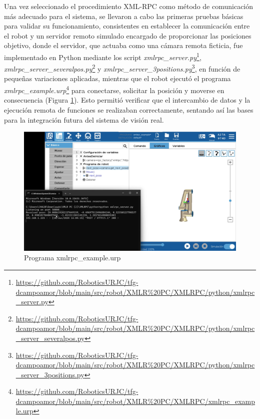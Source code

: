 Una vez seleccionado el procedimiento XML-RPC como método de comunicación más adecuado para el sistema, se llevaron a cabo las primeras pruebas básicas para validar su funcionamiento, consistentes en establecer la comunicación entre el robot y un servidor remoto simulado encargado de proporcionar las posiciones objetivo, donde el servidor, que actuaba como una cámara remota ficticia, fue implementado en Python mediante los script \textit{xmlrpc\_server.py}\footnote{\url{https://github.com/RoboticsURJC/tfg-dcampoamor/blob/main/src/robot/XMLR\%20PC/XMLRPC/python/xmlrpc_server.py}}, \textit{xmlrpc\_server\_severalpos.py}\footnote{\url{https://github.com/RoboticsURJC/tfg-dcampoamor/blob/main/src/robot/XMLR\%20PC/XMLRPC/python/xmlrpc_server_severalpos.py}} y \textit{xmlrpc\_server\_3positions.py}\footnote{\url{https://github.com/RoboticsURJC/tfg-dcampoamor/blob/main/src/robot/XMLR\%20PC/XMLRPC/python/xmlrpc_server_3positions.py}}, en función de pequeñas variaciones aplicadas, mientras que el robot ejecutó el programa \textit{xmlrpc\_example.urp}\footnote{\url{https://github.com/RoboticsURJC/tfg-dcampoamor/blob/main/src/robot/XMLR\%20PC/XMLRPC/xmlrpc_example.urp}} para conectarse, solicitar la posición y moverse en consecuencia (Figura \ref{fig:prueba_xmlrpc}). Esto permitió verificar que el intercambio de datos y la ejecución remota de funciones se realizaban correctamente, sentando así las bases para la integración futura del sistema de visión real.

  \begin{figure}[H]
     \centering
     \begin{center}
       \includegraphics[width=155mm]{figs/xmlrpc_example.png}
     \end{center}
     \caption{Programa xmlrpc\_example.urp}
     \label{fig:prueba_xmlrpc}
  \end{figure}

